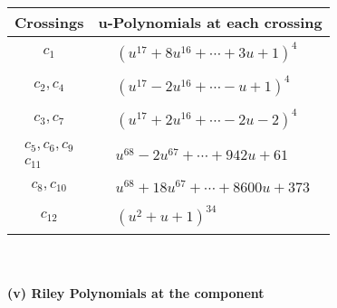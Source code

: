 \documentclass[1p]{elsarticle_modified}
\theoremstyle{definition}
\begin{document}
\begin{tabular}{m{50pt}|m{274pt}}
Crossings & \hspace{64pt}u-Polynomials at each crossing \\
\hline $$\begin{aligned}c_{1}\end{aligned}$$&$\begin{aligned}
&(u^{17}+8 u^{16}+\cdots+3 u+1)^{4}
\end{aligned}$\\
\hline $$\begin{aligned}c_{2},c_{4}\end{aligned}$$&$\begin{aligned}
&(u^{17}-2 u^{16}+\cdots- u+1)^{4}
\end{aligned}$\\
\hline $$\begin{aligned}c_{3},c_{7}\end{aligned}$$&$\begin{aligned}
&(u^{17}+2 u^{16}+\cdots-2 u-2)^{4}
\end{aligned}$\\
\hline $$\begin{aligned}c_{5},c_{6},c_{9}\\c_{11}\end{aligned}$$&$\begin{aligned}
&u^{68}-2 u^{67}+\cdots+942 u+61
\end{aligned}$\\
\hline $$\begin{aligned}c_{8},c_{10}\end{aligned}$$&$\begin{aligned}
&u^{68}+18 u^{67}+\cdots+8600 u+373
\end{aligned}$\\
\hline $$\begin{aligned}c_{12}\end{aligned}$$&$\begin{aligned}
&(u^2+u+1)^{34}
\end{aligned}$\\
\hline
\end{tabular}\\~\\
\newpage\renewcommand{\arraystretch}{1}
\flushleft \textbf{(v) Riley Polynomials at the component}\newline \\
\end{document}
